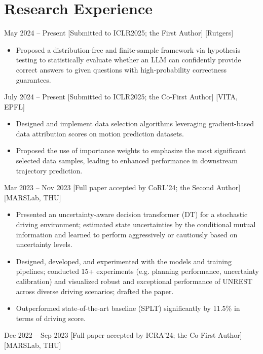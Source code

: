 \documentclass{chicv}
\begin{document}
\section{Research Experience}

{May 2024 -- Present}
[Submitted to ICLR2025; the First Author]
[Rutgers]

\begin{itemize}
	\item Proposed a distribution-free and finite-sample framework via hypothesis testing to statistically evaluate whether an LLM can confidently provide correct answers to given questions with high-probability correctness guarantees.
\end{itemize}

{July 2024 -- Present}
[Submitted to ICLR2025; the Co-First Author]
[VITA, EPFL]

\begin{itemize}
	\item Designed and implement data selection algorithms leveraging gradient-based data attribution scores on motion prediction datasets.
	\item Proposed the use of importance weights to emphasize the most significant selected data samples, leading to enhanced performance in downstream trajectory prediction.
\end{itemize}


{Mar 2023 -- Nov 2023}
[Full paper accepted by CoRL'24; the Second Author]
[MARSLab, THU]

\begin{itemize}
	\item Presented an uncertainty-aware decision transformer (DT) for a stochastic driving environment; estimated state uncertainties by the conditional mutual information and learned to perform aggressively or cautiously based on uncertainty levels.
	\item Designed, developed, and experimented with the models and training pipelines; conducted 15+ experiments (e.g. planning performance, uncertainty calibration) and visualized robust and exceptional performance of UNREST across diverse driving scenarios; drafted the paper.
	\item Outperformed state-of-the-art baseline (SPLT) significantly by 11.5\% in terms of driving score.
\end{itemize}

{Dec 2022 -- Sep 2023}
[Full paper accepted by ICRA'24; the Co-First Author]
[MARSLab, THU]
\end{document}
